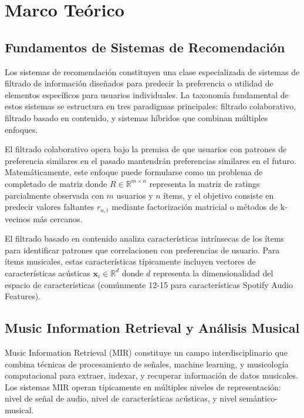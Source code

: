 \documentclass[12pt,a4paper]{article}
\begin{document}
\section{Marco Teórico}

\subsection{Fundamentos de Sistemas de Recomendación}

Los sistemas de recomendación constituyen una clase especializada de sistemas de filtrado de información diseñados para predecir la preferencia o utilidad de elementos específicos para usuarios individuales. La taxonomía fundamental de estos sistemas se estructura en tres paradigmas principales: filtrado colaborativo, filtrado basado en contenido, y sistemas híbridos que combinan múltiples enfoques.

El filtrado colaborativo opera bajo la premisa de que usuarios con patrones de preferencia similares en el pasado mantendrán preferencias similares en el futuro. Matemáticamente, este enfoque puede formularse como un problema de completado de matriz donde $R \in \mathbb{R}^{m \times n}$ representa la matriz de ratings parcialmente observada con $m$ usuarios y $n$ ítems, y el objetivo consiste en predecir valores faltantes $r_{u,i}$ mediante factorización matricial o métodos de k-vecinos más cercanos.

El filtrado basado en contenido analiza características intrínsecas de los ítems para identificar patrones que correlacionen con preferencias de usuario. Para ítems musicales, estas características típicamente incluyen vectores de características acústicas $\mathbf{x}_i \in \mathbb{R}^d$ donde $d$ representa la dimensionalidad del espacio de características (comúnmente 12-15 para características Spotify Audio Features).

\subsection{Music Information Retrieval y Análisis Musical}

Music Information Retrieval (MIR) constituye un campo interdisciplinario que combina técnicas de procesamiento de señales, machine learning, y musicología computacional para extraer, indexar, y recuperar información de datos musicales. Los sistemas MIR operan típicamente en múltiples niveles de representación: nivel de señal de audio, nivel de características acústicas, y nivel semántico-musical.
\end{document}
